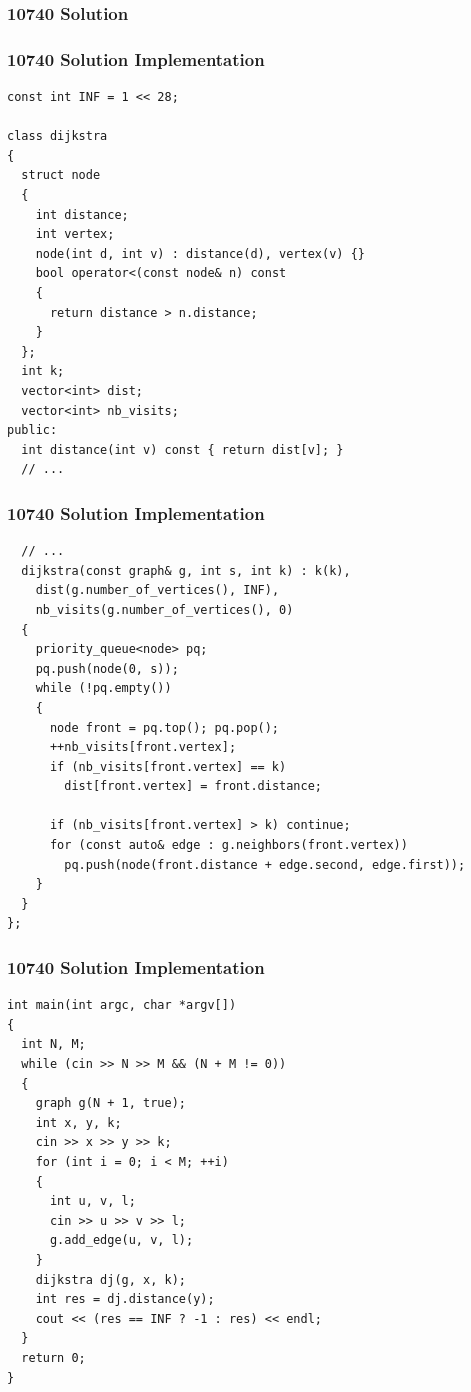 \documentclass{beamer}
\begin{document}
\begin{frame}[containsverbatim]
\frametitle{10740 Solution}

\end{frame}

\begin{frame}[containsverbatim]
\frametitle{10740 Solution Implementation}
\scriptsize
\begin{lstlisting}
const int INF = 1 << 28;

class dijkstra
{
  struct node
  {
    int distance;
    int vertex;
    node(int d, int v) : distance(d), vertex(v) {}
    bool operator<(const node& n) const
    {
      return distance > n.distance;
    }
  };
  int k;
  vector<int> dist;
  vector<int> nb_visits;
public:
  int distance(int v) const { return dist[v]; }
  // ...
\end{lstlisting}
\end{frame}

\begin{frame}[containsverbatim]
\frametitle{10740 Solution Implementation}
\scriptsize
\begin{lstlisting}
  // ...
  dijkstra(const graph& g, int s, int k) : k(k),
    dist(g.number_of_vertices(), INF),
    nb_visits(g.number_of_vertices(), 0)
  {
    priority_queue<node> pq;
    pq.push(node(0, s));
    while (!pq.empty())
    {
      node front = pq.top(); pq.pop();
      ++nb_visits[front.vertex];
      if (nb_visits[front.vertex] == k)
        dist[front.vertex] = front.distance;

      if (nb_visits[front.vertex] > k) continue;
      for (const auto& edge : g.neighbors(front.vertex))
        pq.push(node(front.distance + edge.second, edge.first));
    }
  }
};
\end{lstlisting}

\end{frame}

\begin{frame}[containsverbatim]
\frametitle{10740 Solution Implementation}
\scriptsize
\begin{lstlisting}
int main(int argc, char *argv[])
{
  int N, M;
  while (cin >> N >> M && (N + M != 0))
  {
    graph g(N + 1, true);
    int x, y, k;
    cin >> x >> y >> k;
    for (int i = 0; i < M; ++i)
    {
      int u, v, l;
      cin >> u >> v >> l;
      g.add_edge(u, v, l);
    }
    dijkstra dj(g, x, k);
    int res = dj.distance(y);
    cout << (res == INF ? -1 : res) << endl;
  }
  return 0;
}
\end{lstlisting}

\end{frame}
\end{document}
